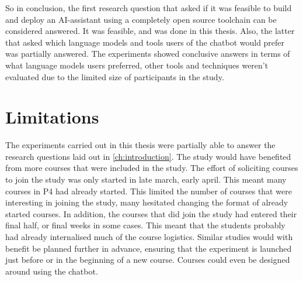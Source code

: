 So in conclusion, the first research question that asked if it was feasible to build and deploy an AI-assistant using a completely open source toolchain can be considered answered. It was feasible, and was done in this thesis. Also, the latter that asked which language models and tools users of the chatbot would prefer was partially answered. The experiments showed conclusive answers in terms of what language models users preferred, other tools and techniques weren't evaluated due to the limited size of participants in the study.
















\section{Limitations}
\label{sec:conclusion_limitations}


The experiments carried out in this thesis were partially able to answer the research questions laid out in \autoref{ch:introduction}. The study would have benefited from more courses that were included in the study. The effort of soliciting courses to join the study was only started in late march, early april. This meant many courses in P4 had already started. This limited the number of courses that were interesting in joining the study, many hesitated changing the format of already started courses. In addition, the courses that did join the study had entered their final half, or final weeks in some cases. This meant that the students probably had already internalised much of the course logistics. Similar studies would with benefit be planned further in advance, ensuring that the experiment is launched just before or in the beginning of a new course. Courses could even be designed around using the chatbot.



